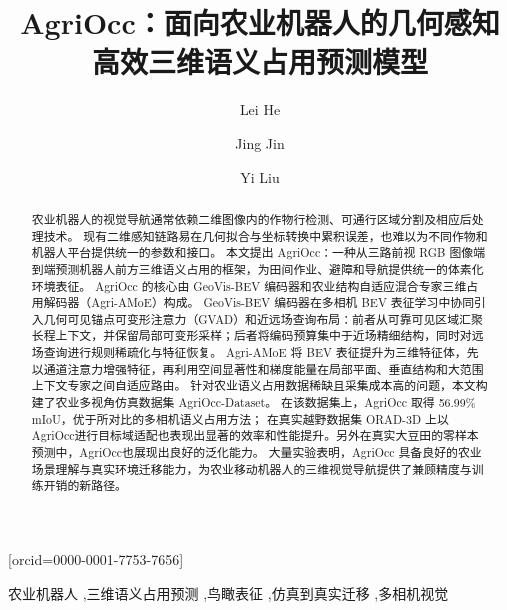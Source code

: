 \documentclass[a4paper,fleqn]{cas-sc}
\begin{document}
\let\WriteBookmarks\relax
\def\floatpagepagefraction{1}
\def\textpagefraction{.001}


\title[mode=title]{AgriOcc：面向农业机器人的几何感知高效三维语义占用预测模型}

\author[1]{Lei He}
\author[1]{Jing Jin}[orcid=0000-0001-7753-7656]
\cormark[1]
\author[2]{Yi Liu}

\begin{abstract}
农业机器人的视觉导航通常依赖二维图像内的作物行检测、可通行区域分割及相应后处理技术。
现有二维感知链路易在几何拟合与坐标转换中累积误差，也难以为不同作物和机器人平台提供统一的参数和接口。
本文提出 AgriOcc：一种从三路前视 RGB 图像端到端预测机器人前方三维语义占用的框架，为田间作业、避障和导航提供统一的体素化环境表征。
AgriOcc 的核心由 GeoVis-BEV 编码器和农业结构自适应混合专家三维占用解码器（Agri-AMoE）构成。
GeoVis-BEV 编码器在多相机 BEV 表征学习中协同引入几何可见锚点可变形注意力（GVAD）和近远场查询布局：前者从可靠可见区域汇聚长程上下文，并保留局部可变形采样；后者将编码预算集中于近场精细结构，同时对远场查询进行规则稀疏化与特征恢复。
Agri-AMoE 将 BEV 表征提升为三维特征体，先以通道注意力增强特征，再利用空间显著性和梯度能量在局部平面、垂直结构和大范围上下文专家之间自适应路由。
针对农业语义占用数据稀缺且采集成本高的问题，本文构建了农业多视角仿真数据集 AgriOcc-Dataset。
在该数据集上，AgriOcc 取得 56.99\% mIoU，优于所对比的多相机语义占用方法；
在真实越野数据集 ORAD-3D 上以AgriOcc进行目标域适配也表现出显著的效率和性能提升。另外在真实大豆田的零样本预测中，AgriOcc也展现出良好的泛化能力。
大量实验表明，AgriOcc 具备良好的农业场景理解与真实环境迁移能力，为农业移动机器人的三维视觉导航提供了兼顾精度与训练开销的新路径。
\end{abstract}
\begin{keywords}
农业机器人 \sep 三维语义占用预测 \sep 鸟瞰表征 \sep 仿真到真实迁移 \sep 多相机视觉
\end{keywords}

\maketitle
\end{document}
